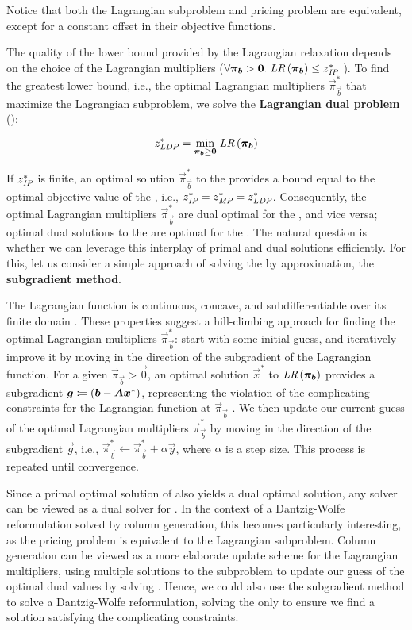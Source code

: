Notice that both the Lagrangian subproblem and pricing problem are equivalent, except for a constant offset in their objective functions.

The quality of the lower bound provided by the Lagrangian relaxation depends on the choice of the Lagrangian multipliers ($\forall \vec{\pi}_\vec{b} > \vec{0}. \; \LR{\vec{\pi}_\vec{b}} \leq z^*_\IP{}$ \cite{thebook}). To find the greatest lower bound, i.e., the optimal Lagrangian multipliers $\vec{\pi}_\vec{b}^*$ that maximize the Lagrangian subproblem, we solve the \textbf{Lagrangian dual problem} (\LDP{}):

\begin{equation*}
z^*_\LDP{} = \underset{\vec{\pi}_\vec{b} \geq \vec{0}}{\min} \; \LR{\vec{\pi}_\vec{b}}
\end{equation*}

If $z^*_{\textit{IP}}{}$ is finite, an optimal solution $\vec{\pi}_\vec{b}^*$ to the \LDP{} provides a bound equal to the optimal objective value of the \MP{}, i.e., $z^*_{\textit{IP}}{} = z^*_{\textit{MP}}{} = z^*_{\textit{LDP}}{}$. Consequently, the optimal Lagrangian multipliers $\vec{\pi}_\vec{b}^*$ are dual optimal for the \MP{}, and vice versa; optimal dual solutions to the \MP{} are optimal for the \LDP{} \cite{thebook}. The natural question is whether we can leverage this interplay of primal and dual solutions efficiently. For this, let us consider a simple approach of solving the \LDP{} by approximation, the \textbf{subgradient method}.

The Lagrangian function \LR{} is continuous, concave, and subdifferentiable over its finite domain \cite{thebook}. These properties suggest a hill-climbing approach for finding the optimal Lagrangian multipliers $\vec{\pi}_\vec{b}^*$: start with some initial guess, and iteratively improve it by moving in the direction of the subgradient of the Lagrangian function. For a given $\vec{\pi}_\vec{b} > \vec{0}$, an optimal solution $\vec{x}^*$ to $\LR{\vec{\pi}_\vec{b}}$ provides a subgradient ${\bm{g}} \coloneqq ({\bm{b}} - {\bm{A}} {\bm{x}}^*)$, representing the violation of the complicating constraints for the Lagrangian function at $\vec{\pi}_\vec{b}$ \cite{thebook}. We then update our current guess of the optimal Lagrangian multipliers $\vec{\pi}_\vec{b}^*$ by moving in the direction of the subgradient $\vec{g}$, i.e., $\vec{\pi}_\vec{b}^* \leftarrow \vec{\pi}_\vec{b}^* + \alpha \vec{y}$, where $\alpha$ is a step size. This process is repeated until convergence.

Since a primal optimal solution of \IP{} also yields a dual optimal solution, any \IP{} solver can be viewed as a dual solver for \LDP{}. In the context of a Dantzig-Wolfe reformulation solved by column generation, this becomes particularly interesting, as the pricing problem is equivalent to the Lagrangian subproblem. Column generation can be viewed as a more elaborate update scheme for the Lagrangian multipliers, using multiple solutions to the subproblem to update our guess of the optimal dual values by solving \MP{} \cite{thebook}. Hence, we could also use the subgradient method to solve a Dantzig-Wolfe reformulation, solving the \MP{} only to ensure we find a solution satisfying the complicating constraints.

